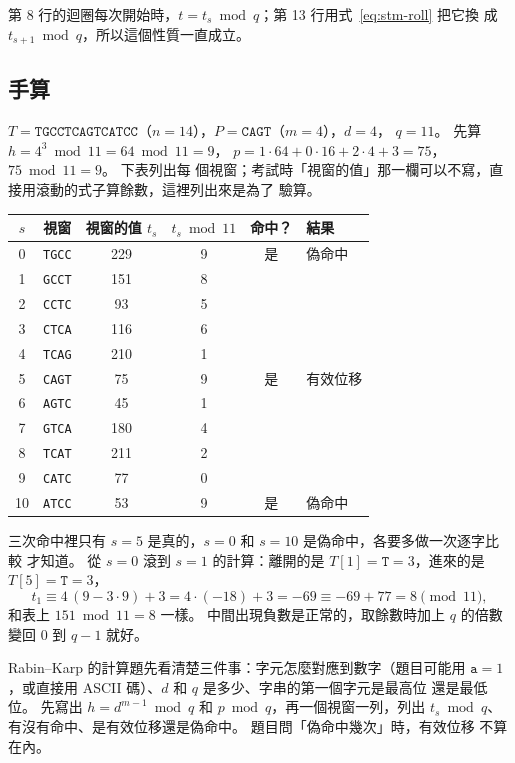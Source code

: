 第 8 行的迴圈每次開始時，$t = t_s \bmod q$；第 13 行用式~\eqref{eq:stm-roll} 把它換
成 $t_{s+1} \bmod q$，所以這個性質一直成立。

\subsection{手算}

$T = \mathtt{TGCCTCAGTCATCC}$（$n = 14$），$P = \mathtt{CAGT}$（$m = 4$），$d = 4$，
$q = 11$。 先算 $h = 4^3 \bmod 11 = 64 \bmod 11 = 9$，
$p = 1 \cdot 64 + 0 \cdot 16 + 2 \cdot 4 + 3 = 75$，$75 \bmod 11 = 9$。 下表列出每
個視窗；考試時「視窗的值」那一欄可以不寫，直接用滾動的式子算餘數，這裡列出來是為了
驗算。

\begin{center}
\begin{tabular}{cccccl}
\toprule
$s$ & 視窗 & 視窗的值 $t_s$ & $t_s \bmod 11$ & 命中？ & 結果 \\
\midrule
0 & \texttt{TGCC} & 229 & 9 & 是 & 偽命中 \\
1 & \texttt{GCCT} & 151 & 8 &  &  \\
2 & \texttt{CCTC} & 93 & 5 &  &  \\
3 & \texttt{CTCA} & 116 & 6 &  &  \\
4 & \texttt{TCAG} & 210 & 1 &  &  \\
5 & \texttt{CAGT} & 75 & 9 & 是 & 有效位移 \\
6 & \texttt{AGTC} & 45 & 1 &  &  \\
7 & \texttt{GTCA} & 180 & 4 &  &  \\
8 & \texttt{TCAT} & 211 & 2 &  &  \\
9 & \texttt{CATC} & 77 & 0 &  &  \\
10 & \texttt{ATCC} & 53 & 9 & 是 & 偽命中 \\
\bottomrule
\end{tabular}
\end{center}

三次命中裡只有 $s = 5$ 是真的，$s = 0$ 和 $s = 10$ 是偽命中，各要多做一次逐字比較
才知道。 從 $s = 0$ 滾到 $s = 1$ 的計算：離開的是 $T[1] = \mathtt{T} = 3$，進來的是
$T[5] = \mathtt{T} = 3$，
\[
t_1 \equiv 4 \, (9 - 3 \cdot 9) + 3 = 4 \cdot (-18) + 3 = -69 \equiv -69 + 77 = 8
\pmod{11},
\]
和表上 $151 \bmod 11 = 8$ 一樣。 中間出現負數是正常的，取餘數時加上 $q$ 的倍數變回
$0$ 到 $q - 1$ 就好。

\begin{examnote}
Rabin--Karp 的計算題先看清楚三件事：字元怎麼對應到數字（題目可能用
$\mathtt{a} = 1$，或直接用 ASCII 碼）、$d$ 和 $q$ 是多少、字串的第一個字元是最高位
還是最低位。 先寫出 $h = d^{m-1} \bmod q$ 和 $p \bmod q$，再一個視窗一列，列出
$t_s \bmod q$、有沒有命中、是有效位移還是偽命中。 題目問「偽命中幾次」時，有效位移
不算在內。
\end{examnote}

